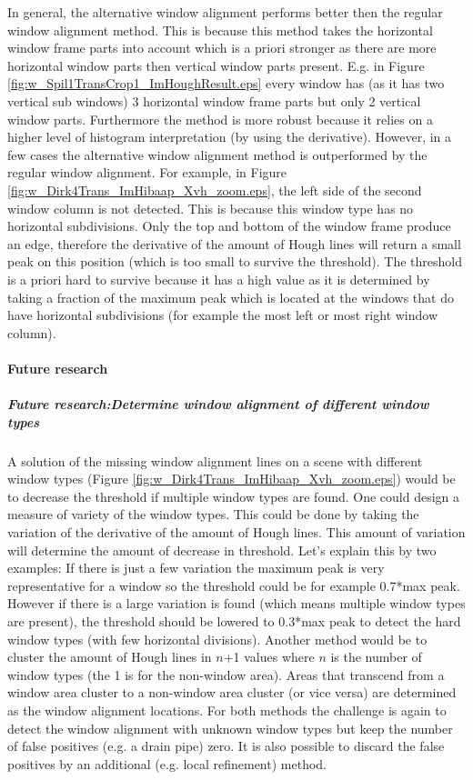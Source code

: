 In general, the alternative window alignment performs better then the regular
window alignment method.  This is because this method takes the  horizontal
window frame parts into account which is a priori stronger as there are more
horizontal window parts then vertical window parts present.  E.g. in Figure
\ref{fig:w_Spil1TransCrop1_ImHoughResult.eps} every window has (as it has two
vertical sub windows) 3 horizontal window frame parts but only 2 vertical window
parts.  Furthermore the method is more robust because it relies on a higher
level of histogram interpretation (by using the derivative).  However, in a few
cases the alternative window alignment method is outperformed by the regular window
alignment. For example, in Figure
\ref{fig:w_Dirk4Trans_ImHibaap_Xvh_zoom.eps}, the left
side of the second window column is not detected.
This is because this window type has no horizontal subdivisions. Only the top and
bottom of the window frame produce an edge, therefore the derivative of the
amount of Hough lines will return a small peak on this position (which is too
small to survive the threshold).  
The threshold is a priori hard to survive because it has a high value as it is
determined by taking a fraction of the maximum peak which is located at the
windows that do have horizontal subdivisions (for example the most left or most
right window column). 





\paragraph{Future research}
\subparagraph{Future research:Determine window alignment of different window types}
A solution of the missing window alignment lines on a scene with different
window types (Figure \ref{fig:w_Dirk4Trans_ImHibaap_Xvh_zoom.eps}) would be to
decrease the threshold if multiple window types are found. One could design a
measure of variety of the window types. This could be done by taking the variation of the
derivative of the amount of Hough lines. This amount of variation will determine
the amount of decrease in threshold. Let's explain this by two examples:
If there is just a few variation the maximum peak is very representative for a
window so the threshold could be for example 0.7*max peak. However if there is a
large variation is found (which means multiple window types are present), the
threshold should be lowered to 0.3*max peak to detect the hard window types
(with few horizontal divisions).
Another method would be to cluster the amount of Hough lines in $n$+1 values
where $n$ is the number of window types (the 1 is for the non-window area).
Areas that transcend from a window area cluster to a non-window area cluster
(or vice versa) are determined as the window alignment locations.
For both methods the challenge is again to detect the window alignment with
unknown window types but keep the number of false positives (e.g. a drain pipe)
zero. It is also possible to discard the false positives by an additional (e.g.
local refinement) method.

